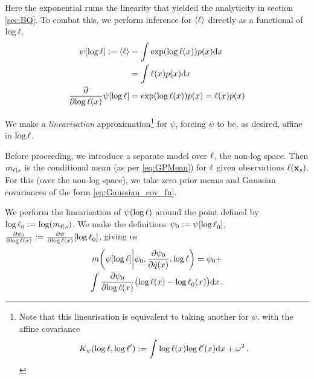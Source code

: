 \documentclass{article}
\begin{document}
Here the exponential ruins the linearity that yielded the analyticity in section \ref{sec:BQ}. To combat this, we perform inference for $\inty{\lfn}$ directly as a functional of $\tr$.
%
\begin{align}
 \psi[\tr] \deq \inty{\lfn} & = \int \exp ( \tr(\lfv)) p(\lfv) \ud \lfv\\
  						    & = \int \lfn(\lfv) p(\lfv) \ud \lfv\\
\pderiv{}{\tr(\lfv)}\psi[\tr] & = \exp (\tr(\lfv)) p(\lfv)  = \lfn(\lfv) p(\lfv) 
\end{align}

We make a \emph{linearisation} approximation\footnote{Note that this linearisation is equivalent to taking another \gpb for $\psi$. with the affine covariance
\begin{equation*}
 K_\psi(\tr,\tr')
\deq
\int\tr(\lfv) \tr'(\lfv) \ud \lfv
+ \omega^2\,.
\end{equation*}
} 
for $\psi$, forcing $\psi$ to be, as desired, affine in $\tr$. 

Before proceeding, we introduce a separate \gpb model over $\lfn$, the non-log space.  Then $m_{\lfn|s}$ is the \gpb conditional mean (as per \eqref{eq:GPMean}) for $\lfn$ given observations $\lfn(\vlfv_s)$. For this \gpb (over the non-log space), we take zero prior means and Gaussian
covariances of the form \eqref{eq:Gaussian_cov_fn}. 

We perform the linearisation of $\psi(\tr)$ around the point defined by $\tr_0 \deq \log (m_{\lfn|s})$. We make the definitions 
$\psi_0 \deq \psi[\tr_0]$, $\pderiv{\psi_0}{\tr(\lfv)} \deq \pderiv{\psi}{\tr(\lfv)}[\tr_0]$, giving us
\begin{multline}\label{eq:linearisation}
\novmean{\psi[\tr]}{\psi_0,\pderiv{\psi_0}{\tq(\lfv)}, \tr} 
= \psi_0+\\
\int \pderiv{\psi_0}{\tr(\lfv)}\bigl(\tr(\lfv)-\tr_0(\lfv)\bigr)\ud\lfv\,.
\end{multline}
\end{document}
